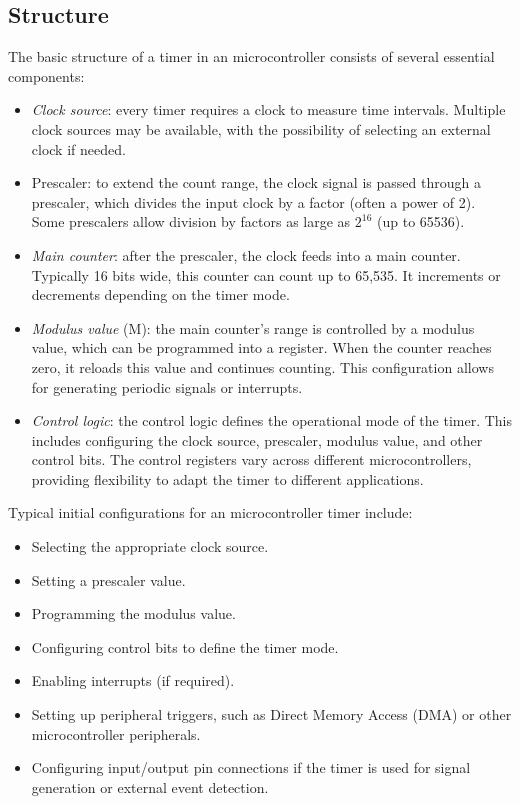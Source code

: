 \subsection{Structure}
The basic structure of a timer in an microcontroller consists of several essential components:
\begin{itemize}
    \item \textit{Clock source}: every timer requires a clock to measure time intervals. 
        Multiple clock sources may be available, with the possibility of selecting an external clock if needed.
    \item Prescaler: to extend the count range, the clock signal is passed through a prescaler, which divides the input clock by a factor (often a power of 2). 
        Some prescalers allow division by factors as large as $2^{16}$ (up to 65536).
    \item \textit{Main counter}: after the prescaler, the clock feeds into a main counter. 
        Typically 16 bits wide, this counter can count up to 65,535. 
        It increments or decrements depending on the timer mode.
    \item \textit{Modulus value} (M): the main counter's range is controlled by a modulus value, which can be programmed into a register.
        When the counter reaches zero, it reloads this value and continues counting. 
        This configuration allows for generating periodic signals or interrupts.
    \item \textit{Control logic}: the control logic defines the operational mode of the timer. 
        This includes configuring the clock source, prescaler, modulus value, and other control bits. 
        The control registers vary across different microcontrollers, providing flexibility to adapt the timer to different applications.
\end{itemize}
Typical initial configurations for an microcontroller timer include:
\begin{itemize}
    \item Selecting the appropriate clock source.
    \item Setting a prescaler value.
    \item Programming the modulus value.
    \item Configuring control bits to define the timer mode.
    \item Enabling interrupts (if required).
    \item Setting up peripheral triggers, such as Direct Memory Access (DMA) or other microcontroller peripherals.
    \item Configuring input/output pin connections if the timer is used for signal generation or external event detection.
\end{itemize}

